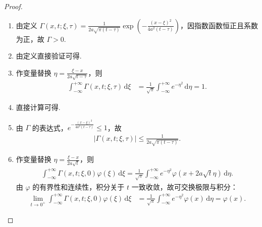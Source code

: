 \documentclass[../../main.tex]{subfiles}%
\begin{document}
\begin{proof}
\begin{enumerate}[(1)]
\item 由定义 $\varGamma(x,t;\xi,\tau)=\frac{1}{2a\sqrt{\pi(t-\tau)}}\exp\left(-\frac{(x-\xi)^2}{4a^2(t-\tau)}\right)$，因指数函数恒正且系数为正，故 $\varGamma>0$.

\item 由定义直接验证可得.

\item 作变量替换 $\eta=\frac{\xi-x}{2a\sqrt{t-\tau}}$，则
\begin{align*}
\int_{-\infty}^{+\infty}\varGamma(x,t;\xi,\tau)\,\mathrm{d}\xi
&=\frac{1}{\sqrt{\pi}}\int_{-\infty}^{+\infty}e^{-\eta^2}\,\mathrm{d}\eta=1.
\end{align*}

\item 直接计算可得.

\item 由 $\varGamma$ 的表达式，$e^{-\frac{(x-\xi)^2}{4a^2(t-\tau)}}\leqslant 1$，故
\begin{align*}
|\varGamma(x,t;\xi,\tau)|\leqslant \frac{1}{2a\sqrt{\pi(t-\tau)}}.
\end{align*}

\item 作变量替换 $\eta=\frac{\xi-x}{2a\sqrt{t}}$，则
\begin{align*}
\int_{-\infty}^{+\infty}\varGamma(x,t;\xi,0)\varphi(\xi)\,\mathrm{d}\xi
=\frac{1}{\sqrt{\pi}}\int_{-\infty}^{+\infty}e^{-\eta^2}\varphi(x+2a\sqrt{t}\eta)\,\mathrm{d}\eta.
\end{align*}
由 $\varphi$ 的有界性和连续性，积分关于 $t$ 一致收敛，故可交换极限与积分：
\begin{align*}
\lim_{t\to 0^+}\int_{-\infty}^{+\infty}\varGamma(x,t;\xi,0)\varphi(\xi)\,\mathrm{d}\xi
&=\frac{1}{\sqrt{\pi}}\int_{-\infty}^{+\infty}e^{-\eta^2}\varphi(x)\,\mathrm{d}\eta
=\varphi(x).
\end{align*}
\end{enumerate}
\end{proof}
\end{document}
